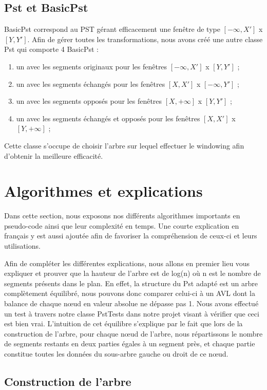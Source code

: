 \documentclass[10pt,a4paper]{article}
\begin{document}
\subsection{Pst et BasicPst}
BasicPst correspond au PST gérant efficacement une fenêtre de type $[-\infty, X']$ x $[Y, Y']$. Afin de gérer toutes les transformations, nous avons créé une autre classe Pst qui comporte 4 BasicPst :
\begin{enumerate}
	\item un avec les segments originaux pour les fenêtres $[-\infty, X']$ x $[Y, Y']$ ;
	\item un avec les segments échangés pour les fenêtres $[X, X']$ x $[-\infty, Y']$ ;
	\item un avec les segments opposés pour les fenêtres $[X, +\infty]$ x $[Y, Y']$ ;
	\item un avec les segments échangés et opposés pour les fenêtres $[X, X']$ x $[Y, +\infty]$ ;
\end{enumerate}

Cette classe s'occupe de choisir l'arbre sur lequel effectuer le windowing afin d'obtenir la meilleure efficacité.

\newpage
\section{Algorithmes et explications}
Dans cette section, nous exposons nos différents algorithmes importants en pseudo-code ainsi que leur complexité en temps. Une courte explication en français y est aussi ajoutée afin de favoriser la compréhension de ceux-ci et leurs utilisations.


Afin de compléter les différentes explications, nous allons en premier lieu vous expliquer et prouver que la hauteur de l'arbre est de log(n) où n est le nombre de segments présents dans le plan. En effet, la structure du Pst adapté est un arbre complètement équilibré, nous pouvons donc comparer celui-ci à un AVL dont la balance de chaque nœud en valeur absolue ne dépasse pas 1.
Nous avons effectué un test à travers notre classe PstTests dans notre projet visant à vérifier que ceci est bien vrai. L'intuition de cet équilibre s'explique par le fait que lors de la construction de l’arbre, pour chaque nœud de l'arbre, nous répartissons le nombre de segments restants en deux parties égales à un segment près, et chaque partie constitue toutes les données du sous-arbre gauche ou droit de ce nœud.
\subsection{Construction de l'arbre}
\end{document}
